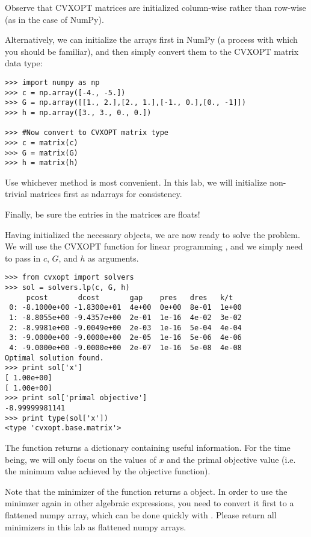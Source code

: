 \begin{warn}
Observe that CVXOPT matrices are initialized column-wise rather than row-wise (as in the case of NumPy).

Alternatively, we can initialize the arrays first in NumPy (a process with which you should be familiar),
and then simply convert them to the CVXOPT matrix data type:
\begin{lstlisting}
>>> import numpy as np
>>> c = np.array([-4., -5.])
>>> G = np.array([[1., 2.],[2., 1.],[-1., 0.],[0., -1]])
>>> h = np.array([3., 3., 0., 0.])

>>> #Now convert to CVXOPT matrix type
>>> c = matrix(c)
>>> G = matrix(G)
>>> h = matrix(h)
\end{lstlisting}
Use whichever method is most convenient. 
In this lab, we will initialize non-trivial matrices first as ndarrays for consistency.

Finally, be sure the entries in the matrices are floats!
\end{warn}

Having initialized the necessary objects, we are now ready to solve the problem.
We will use the CVXOPT function for linear programming , and we simply need to pass in $c$, $G$, and $h$ as arguments.
\begin{lstlisting}
>>> from cvxopt import solvers
>>> sol = solvers.lp(c, G, h)
     pcost       dcost       gap    pres   dres   k/t
 0: -8.1000e+00 -1.8300e+01  4e+00  0e+00  8e-01  1e+00
 1: -8.8055e+00 -9.4357e+00  2e-01  1e-16  4e-02  3e-02
 2: -8.9981e+00 -9.0049e+00  2e-03  1e-16  5e-04  4e-04
 3: -9.0000e+00 -9.0000e+00  2e-05  1e-16  5e-06  4e-06
 4: -9.0000e+00 -9.0000e+00  2e-07  1e-16  5e-08  4e-08
Optimal solution found.
>>> print sol['x']
[ 1.00e+00]
[ 1.00e+00]
>>> print sol['primal objective']
-8.99999981141
>>> print type(sol['x'])
<type 'cvxopt.base.matrix'>
\end{lstlisting}
The function  returns a dictionary containing useful information.
For the time being, we will only focus on the values of $x$ and the primal objective value (i.e. the minimum value achieved by the objective function).

\begin{warn}
Note that the minimizer of the  function returns a  object.
In order to use the minimzer again in other algebraic expressions, you need to convert it first to a flattened numpy array, which can be done quickly with .
Please return all minimizers in this lab as flattened numpy arrays.
\end{warn}


